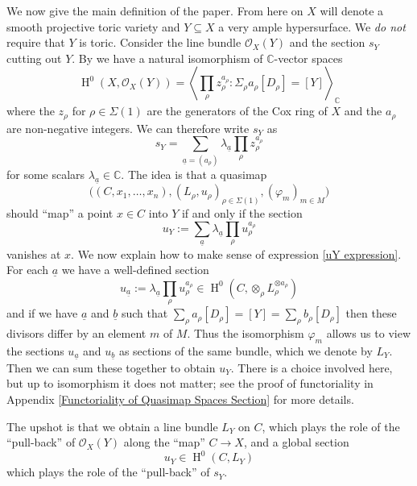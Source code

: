 \documentclass[11pt]{amsart}
\newcommand{\OO}{\mathcal{O}}
\renewcommand{\to}{\rightarrow}
\newcommand{\CC}{\mathbb{C}}
\newcommand{\HH}{\operatorname{H}}
\theoremstyle{definition}
\theoremstyle{definition}
\begin{document}
We now give the main definition of the paper. From here on $X$ will denote a smooth projective toric variety and $Y \subseteq X$ a very ample hypersurface. We \emph{do not} require that $Y$ is toric.
Consider the line bundle $\OO_X(Y)$ and the section $s_Y$ cutting out $Y$. By \cite{CoxRing} we have a natural isomorphism of $\CC$-vector spaces
\begin{equation*} \HH^0(X,\OO_X(Y)) = \left\langle \prod_{\rho} z_\rho^{a_\rho} : \Sigma_\rho a_\rho [D_\rho] = [Y] \right\rangle_{\CC} \end{equation*}
where the $z_\rho$ for $\rho \in \Sigma(1)$ are the generators of the Cox ring of $X$ and the $a_\rho$ are non-negative integers. We can therefore write $s_Y$ as
\begin{equation*} s_Y = \sum_{\underline{a}=(a_\rho)} \lambda_{\underline{a}} \prod_\rho z_\rho^{a_\rho} \end{equation*}
for some scalars $\lambda_{\underline{a}} \in \CC$. The idea is that a quasimap
\begin{equation*} \big((C,x_1,\ldots,x_n), (L_\rho,u_\rho)_{\rho \in \Sigma(1)}, (\varphi_m)_{m \in M}\big) \end{equation*}
should ``map'' a point $x \in C$ into $Y$ if and only if the section
\begin{equation} \label{uY expression} u_Y := \sum_{\underline{a}} \lambda_{\underline{a}} \prod_\rho u_\rho^{a_\rho} \end{equation}
vanishes at $x$. We now explain how to make sense of expression \eqref{uY expression}. For each $\underline{a}$ we have a well-defined section
\begin{equation*} u_{\underline{a}} := \lambda_{\underline{a}} \prod_\rho u_\rho^{a_\rho} \in \HH^0(C,\otimes_\rho L_\rho^{\otimes a_\rho}) \end{equation*}
and if we have $\underline{a}$ and $\underline{b}$ such that $\sum_\rho a_\rho [D_\rho] = [Y] = \sum_\rho b_\rho [D_\rho]$ then these divisors differ by an element $m$ of $M$. Thus the isomorphism $\varphi_m$ allows us to view the sections $u_{\underline{a}}$ and $u_{\underline{b}}$ as sections of the same bundle, which we denote by $L_Y$. Then we can sum these together to obtain $u_Y$. There is a choice involved here, but up to isomorphism it does not matter; see the proof of functoriality in Appendix \ref{Functoriality of Quasimap Spaces Section} for more details.

The upshot is that we obtain a line bundle $L_Y$ on $C$, which plays the role of the ``pull-back'' of $\OO_X(Y)$ along the ``map'' $C \to X$, and a global section
\begin{equation*} u_Y \in \HH^0(C,L_Y) \end{equation*}
which plays the role of the ``pull-back'' of $s_Y$.
\end{document}

